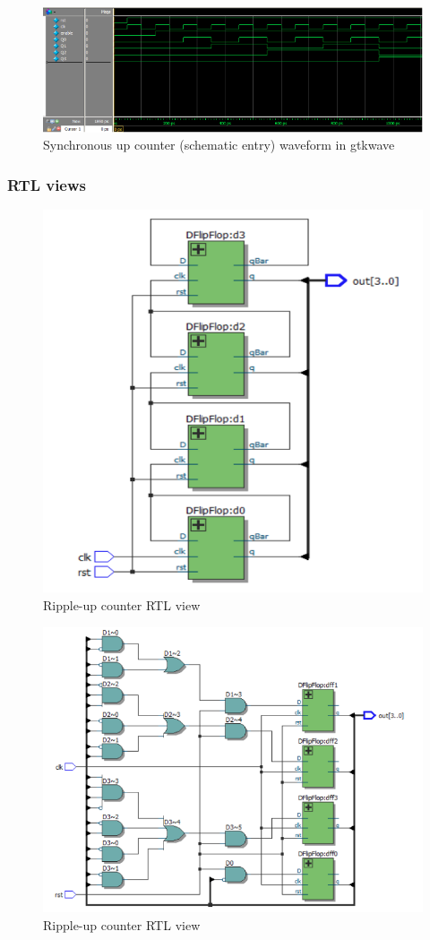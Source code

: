 \documentclass{article}
\begin{document}
	\begin{figure}[H]
	  \centering
	  \includegraphics[width=0.75\linewidth]{figures/waveforms/schem_synUp_wave.png}
	  \caption{Synchronous up counter (schematic entry) waveform in gtkwave}
   	  \label{fig:schem_synUp_waveform}
	\end{figure}

	\subsubsection{RTL views}
	\begin{figure}[H]
	  \centering
	  \includegraphics[width=0.75\linewidth]{figures/RTLs/rippleUp_RTL.png}
	  \caption{Ripple-up counter RTL view}
	  \label{fig:rippleUp_RTL}
	\end{figure}
	  
	\begin{figure}[H]
	  \centering
	  \includegraphics[width=0.75\linewidth]{figures/RTLs/synUp_RTL.png}
	  \caption{Ripple-up counter RTL view}
	  \label{fig:synUp_RTL}
	\end{figure}
\end{document}
